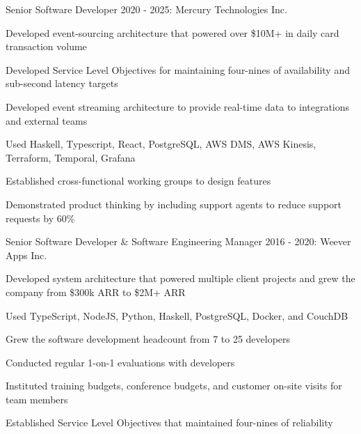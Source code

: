 

\begin{cventries}

  \cventry
    {Senior Software Developer} %
    {2020 - 2025: Mercury Technologies Inc.} %
    {} %
    {} %
    {
      \begin{cvitems} %
        \item {Developed event-sourcing architecture that powered over \$10M+ in daily card transaction volume}
        \item {Developed Service Level Objectives for maintaining four-nines of availability and sub-second latency targets}
        \item {Developed event streaming architecture to provide real-time data to integrations and external teams}
        \item {Used Haskell, Typescript, React, PostgreSQL, AWS DMS, AWS Kinesis, Terraform, Temporal, Grafana}
        \item {Established cross-functional working groups to design features}
        \item {Demonstrated product thinking by including support agents to reduce support requests by 60\%}
      \end{cvitems}
    }
    {}

  \cventry
    {Senior Software Developer \& Software Engineering Manager} %
    {2016 - 2020: Weever Apps Inc.} %
    {} %
    {} %
    {
      \begin{cvitems} %
        \item {Developed system architecture that powered multiple client projects and grew the company from \$300k ARR to \$2M+ ARR}
        \item {Used TypeScript, NodeJS, Python, Haskell, PostgreSQL, Docker, and CouchDB}
        \item {Grew the software development headcount from 7 to 25 developers}
        \item {Conducted regular 1-on-1 evaluations with developers}
        \item {Instituted training budgets, conference budgets, and customer on-site visits for team members}
        \item {Established Service Level Objectives that maintained four-nines of reliability}
      \end{cvitems}
    }
    {}


\end{cventries}
